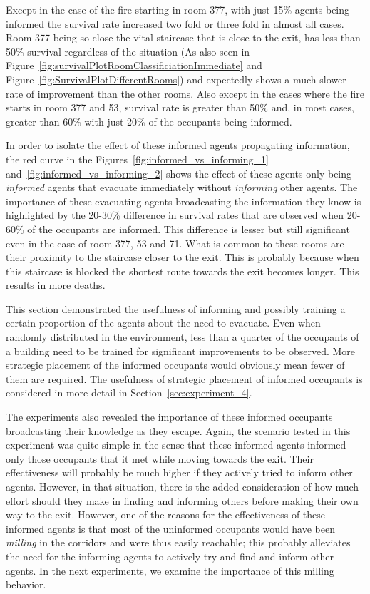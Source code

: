 Except in the case of the fire starting in room 377, with just 15\% agents being informed the survival rate increased two fold or three fold in almost all cases. Room 377 being so close the vital staircase that is close to the exit, has less than 50\% survival regardless of the situation (As also seen in Figure~\ref{fig:survivalPlotRoomClassificiationImmediate} and Figure~\ref{fig:SurvivalPlotDifferentRooms}) and expectedly shows a much slower rate of improvement than the other rooms. Also except in the cases where the fire starts in room 377 and 53, survival rate is greater than 50\% and, in most cases, greater than 60\% with just 20\% of the occupants being informed.

In order to isolate the effect of these informed agents propagating information, the red curve in the Figures~\ref{fig:informed_vs_informing_1} and~\ref{fig:informed_vs_informing_2}  shows the effect of these agents only being \emph{informed} agents that evacuate immediately without \emph{informing} other agents. The importance of these evacuating agents broadcasting the information they know is highlighted by the 20-30\% difference in survival rates that are observed when 20-60\% of the occupants are informed. This difference is lesser but still significant even in the case of room 377, 53 and 71. What is common to these rooms are their proximity to the staircase closer to the exit. This is probably because when this staircase is blocked the shortest route towards the exit becomes longer. This results in more deaths.

This section demonstrated the usefulness of informing and possibly training a certain proportion of the agents about the need to evacuate. Even when randomly distributed in the environment, less than a quarter of the occupants of a building need to be trained for significant improvements to be observed. More strategic placement of the informed occupants would obviously mean fewer of them are required. The usefulness of strategic placement of informed occupants is considered in more detail in Section~\ref{sec:experiment_4}.

The experiments also revealed the importance of these informed occupants broadcasting their knowledge as they escape. Again, the scenario tested in this experiment was quite simple in the sense that these informed agents informed only those occupants that it met while moving towards the exit. Their effectiveness will probably be much higher if they actively tried to inform other agents. However, in that situation, there is the added consideration of how much effort should they make in finding and informing others before making their own way to the exit. However, one of the reasons for the effectiveness of these informed agents is that most of the uninformed occupants would have been \emph{milling} in the corridors and were thus easily reachable; this probably alleviates the need for the informing agents to actively try and find and inform other agents. In the next experiments, we examine the importance of this milling behavior.



